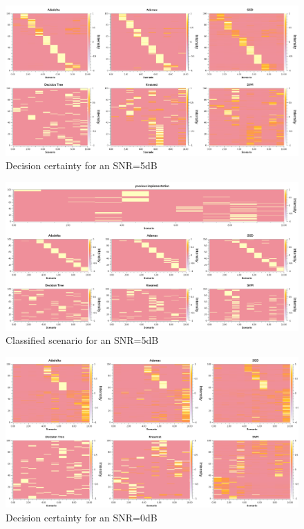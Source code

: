 \begin{figure}[!htb]
    \centering
      \includegraphics[width=\textwidth]{figures/prob_snr_5}
      \caption{Decision certainty for an SNR=5dB}
      \label{fig:prob_snr_5}
\end{figure}

\begin{figure}[!htb]
    \centering
      \includegraphics[width=\textwidth]{figures/scn_snr_5}
      \caption{Classified scenario for an SNR=5dB}
      \label{fig:scn_snr_5}
\end{figure}

\begin{figure}[!htb]
    \centering
      \includegraphics[width=\textwidth]{figures/prob_snr_0}
      \caption{Decision certainty for an SNR=0dB}
      \label{fig:prob_snr_0}
\end{figure}


